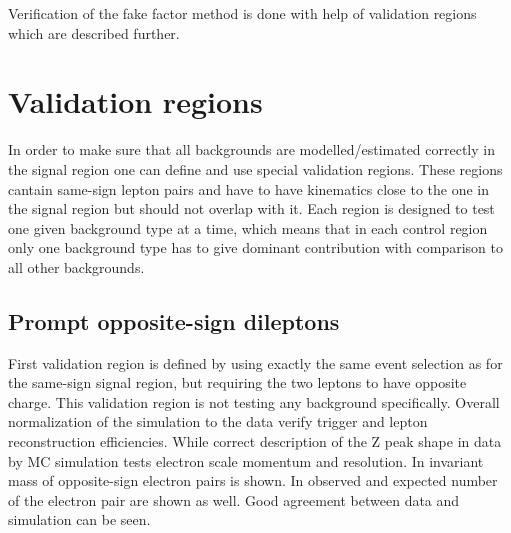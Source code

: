 Verification of the fake factor method is done with help of validation regions which are described further.






\section{Validation regions}

In order to make sure that all backgrounds are modelled/estimated correctly in the signal region one can define and use special validation regions.
These regions cantain same-sign lepton pairs and have to have kinematics close to the one in the signal region but should not overlap with it. 
Each region is designed to test one given background type at a time,
which means that in each control region only one background type has to give dominant contribution with comparison to all other backgrounds.

\subsection{Prompt opposite-sign dileptons}

First validation region is defined by using exactly the same event selection as for the same-sign signal region,
but requiring the two leptons to have opposite charge. 
This validation region is not testing any background specifically.
Overall normalization of the simulation to the data verify trigger and lepton reconstruction efficiencies.
While correct description of the Z peak shape in data by MC simulation tests electron scale momentum and resolution.
In  invariant mass of opposite-sign electron pairs is shown.
In  observed and expected number of the electron pair are shown as well.
Good agreement between data and simulation can be seen.

